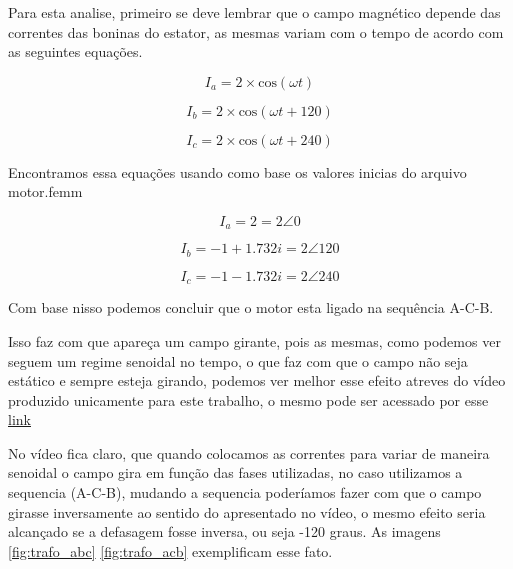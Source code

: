 \documentclass[
	12pt,				%
	openright,			%
	twoside,			%
	a4paper,			%
	english,			%
	french,				%
	spanish,			%
	brazil,				%
	]{abntex2}
\begin{document}
Para esta analise, primeiro se deve lembrar  que o campo magnético depende das correntes das boninas do estator, as mesmas  variam com o tempo de acordo com as seguintes equações.

\begin{equation}
	I_{a} = 2 \times \mathrm{cos} (\omega t) 
\end{equation}

\begin{equation}
	I_{b} = 2 \times \mathrm{cos} (\omega t + 120) 
\end{equation}

\begin{equation}
	I_{c} = 2 \times \mathrm{cos} (\omega t + 240) 
\end{equation}

Encontramos essa equações usando como base os valores inicias do arquivo motor.femm 

\begin{equation}
	I_{a} = 2 = 2 \angle 0 
\end{equation}

\begin{equation}
	I_{b} = -1 + 1.732i = 2 \angle 120
\end{equation}

\begin{equation}
	I_{c} =  -1 - 1.732i = 2 \angle 240 
\end{equation}

Com base nisso podemos concluir que o motor esta ligado na sequência A-C-B.

Isso faz com que apareça um campo girante, pois as mesmas, como podemos ver seguem um regime senoidal no tempo, o que faz com que o campo não seja estático e sempre esteja girando, podemos ver melhor esse efeito atreves do vídeo produzido unicamente para este trabalho, o mesmo pode ser acessado por esse \href{https://www.youtube.com/watch?v=nX_oYFQX8Uc}{link}

No vídeo fica claro, que quando colocamos as correntes para variar de maneira senoidal o campo gira em função das fases utilizadas, no caso utilizamos a sequencia (A-C-B), mudando a sequencia poderíamos fazer com que o campo girasse inversamente ao sentido do apresentado no vídeo, o mesmo efeito seria alcançado se a defasagem fosse inversa, ou seja -120 graus. As imagens \ref{fig:trafo_abc} \ref{fig:trafo_acb} exemplificam esse fato.
\end{document}
